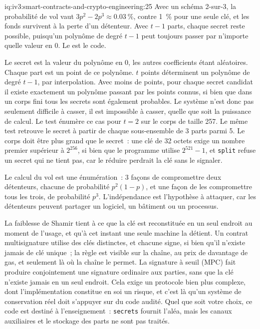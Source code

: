 \begin{solution}{iq:iv3:smart-contracts-and-crypto-engineering:25}
Avec un schéma 2-sur-3, la probabilité de vol vaut $3p^2 - 2p^3 \approx 0.03~\%$, contre 1~\% pour une seule clé, et les fonds survivent à la perte d'un détenteur. Avec $t - 1$ parts, chaque secret reste possible, puisqu'un polynôme de degré $t - 1$ peut toujours passer par n'importe quelle valeur en $0$. Le  est le code.
\label{lst:iv3:cr:shamir}

Le secret est la valeur du polynôme en 0, les autres coefficients étant aléatoires. Chaque part est un point de ce polynôme. $t$ points déterminent un polynôme de degré $t - 1$, par interpolation. Avec moins de points, pour chaque secret candidat il existe exactement un polynôme passant par les points connus, si bien que dans un corps fini tous les secrets sont également probables. Le système n'est donc pas seulement difficile à casser, il est impossible à casser, quelle que soit la puissance de calcul. Le test énumère ce cas pour $t = 2$ sur le corps de taille 257. Le même test retrouve le secret à partir de chaque sous-ensemble de 3 parts parmi 5. Le corps doit être plus grand que le secret~: une clé de 32 octets exige un nombre premier supérieur à $2^{256}$, si bien que le programme utilise $2^{521} - 1$, et \texttt{split} refuse un secret qui ne tient pas, car le réduire perdrait la clé sans le signaler.

Le calcul du vol est une énumération~: 3 façons de compromettre deux détenteurs, chacune de probabilité $p^2(1-p)$, et une façon de les compromettre tous les trois, de probabilité $p^3$. L'indépendance est l'hypothèse à attaquer, car les détenteurs peuvent partager un logiciel, un bâtiment ou un processus.

La faiblesse de Shamir tient à ce que la clé est reconstituée en un seul endroit au moment de l'usage, et qu'à cet instant une seule machine la détient. Un contrat multisignature utilise des clés distinctes, et chacune signe, si bien qu'il n'existe jamais de clé unique~; la règle est visible sur la chaîne, au prix de davantage de gas, et seulement là où la chaîne le permet. La signature à seuil (MPC) fait produire conjointement une signature ordinaire aux parties, sans que la clé n'existe jamais en un seul endroit. Cela exige un protocole bien plus complexe, dont l'implémentation constitue en soi un risque, et c'est là qu'un système de conservation réel doit s'appuyer sur du code audité. Quel que soit votre choix, ce code est destiné à l'enseignement~: \texttt{secrets} fournit l'aléa, mais les canaux auxiliaires et le stockage des parts ne sont pas traités.

\end{solution}

